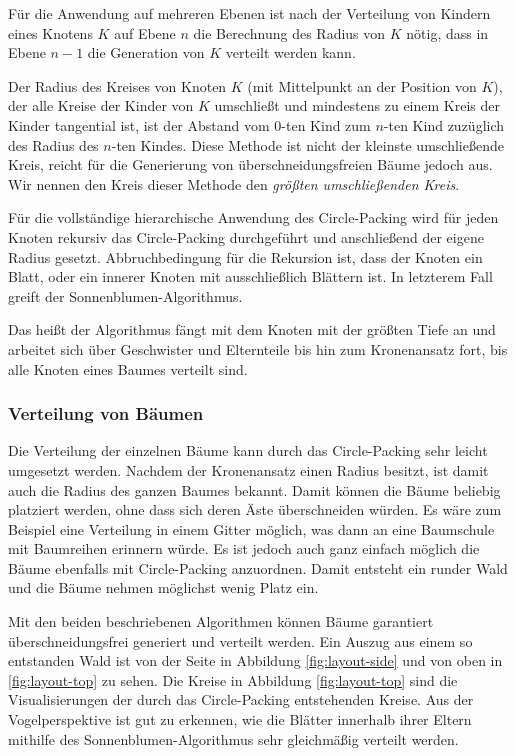 Für die Anwendung auf mehreren Ebenen ist nach der Verteilung von Kindern eines Knotens $K$ auf Ebene $n$ die Berechnung des Radius von $K$ nötig, dass in Ebene $n - 1$ die Generation von $K$ verteilt werden kann.

Der Radius des Kreises von Knoten $K$ (mit Mittelpunkt an der Position von $K$), der alle Kreise der Kinder von $K$ umschließt und mindestens zu einem Kreis der Kinder tangential ist, ist der Abstand vom $0$-ten Kind zum $n$-ten Kind zuzüglich des Radius des $n$-ten Kindes. Diese Methode ist nicht der kleinste umschließende Kreis, reicht für die Generierung von überschneidungsfreien Bäume jedoch aus. Wir nennen den Kreis dieser Methode den \textit{größten umschließenden Kreis}.

Für die vollständige hierarchische Anwendung des Circle-Packing wird für jeden Knoten rekursiv das Circle-Packing durchgeführt und anschließend der eigene Radius gesetzt. Abbruchbedingung für die Rekursion ist, dass der Knoten ein Blatt, oder ein innerer Knoten mit ausschließlich Blättern ist. In letzterem Fall greift der Sonnenblumen-Algorithmus.

Das heißt der Algorithmus fängt mit dem Knoten mit der größten Tiefe an und arbeitet sich über Geschwister und Elternteile bis hin zum Kronenansatz fort, bis alle Knoten eines Baumes verteilt sind.

\subsubsection*{Verteilung von Bäumen}

Die Verteilung der einzelnen Bäume kann durch das Circle-Packing sehr leicht umgesetzt werden. Nachdem der Kronenansatz einen Radius besitzt, ist damit auch die Radius des ganzen Baumes bekannt. Damit können die Bäume beliebig platziert werden, ohne dass sich deren Äste überschneiden würden. Es wäre zum Beispiel eine Verteilung in einem Gitter möglich, was dann an eine Baumschule mit Baumreihen erinnern würde. Es ist jedoch auch ganz einfach möglich die Bäume ebenfalls mit Circle-Packing anzuordnen. Damit entsteht ein runder Wald und die Bäume nehmen möglichst wenig Platz ein.

Mit den beiden beschriebenen Algorithmen können Bäume garantiert überschneidungsfrei generiert und verteilt werden. Ein Auszug aus einem so entstanden Wald ist von der Seite in Abbildung \ref{fig:layout-side} und von oben in \ref{fig:layout-top} zu sehen. Die Kreise in Abbildung \ref{fig:layout-top} sind die Visualisierungen der durch das Circle-Packing entstehenden Kreise. Aus der Vogelperspektive ist gut zu erkennen, wie die Blätter innerhalb ihrer Eltern mithilfe des Sonnenblumen-Algorithmus sehr gleichmäßig verteilt werden.

